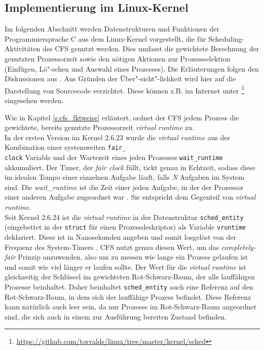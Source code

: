 \subsection{Implementierung im Linux-Kernel}\label{s:cstructs}
Im folgenden Abschnitt werden Datenstrukturen und Funktionen der Programmiersprache C aus dem Linux-Kernel vorgestellt, die für Scheduling-Aktivitäten des CFS genutzt werden. Dies umfasst die gewichtete Berechnung der genutzten Prozessorzeit sowie den nötigen Aktionen zur Prozessselektion (Einfügen, Lö"-schen und Auswahl eines Prozesses). Die Erläuterungen folgen den Diskussionen aus \cite{rlove}. Aus Gründen der Über"-sicht"-lichkeit wird hier auf die Darstellung von Sourcecode verzichtet. Diese können z.B. im Internet unter \footnote{\url{https://github.com/torvalds/linux/tree/master/kernel/sched}} eingesehen werden.

Wie in Kapitel \ref{s:cfs_fktweise} erläutert, ordnet der CFS jedem Prozess die gewichtete, bereits genutzte Prozessorzeit \textit{virtual runtime} zu. \\
In der ersten Version im Kernel 2.6.23 wurde die \textit{virtual runtime} aus der Kombination einer systemweiten \texttt{fair\_\\clock} Variable und der Wartezeit eines jeden Prozesses \texttt{wait\_runtime} akkumuliert. Der Timer, der \textit{fair clock} füllt, tickt genau in Echtzeit, sodass diese im idealen Tempo einer einzelnen Aufgabe läuft, falls \textit{N} Aufgaben im System sind. Die \textit{wait\_runtime} ist die Zeit einer jeden Aufgabe, in der der Prozessor einer anderen Aufgabe zugeordnet war \cite{cpabla}. Sie entspricht dem Gegenteil von \textit{virtual runtime}.\\
Seit Kernel 2.6.24 ist die \textit{virtual runtime} in der Datenstruktur \texttt{sched\_entity} (eingebettet in der \texttt{struct} für einen Prozessdeskriptor) als Variable \texttt{vrun\-time} deklariert. Diese ist in Nanosekunden angeben und somit losgelöst von der Frequenz des System-Timers \cite{rlove}. CFS nutzt genau diesen Wert, um das \textit{completely-fair} Prinzip anzuwenden, also um zu messen wie lange ein Prozess gelaufen ist und somit wie viel länger er laufen sollte.
Der Wert für die \textit{virtual runtime} ist gleichzeitig der Schlüssel im gewichteten Rot-Schwarz-Baum, der alle lauffähigen Prozesse beinhaltet. Daher beinhaltet \texttt{sched\_entity} auch eine Referenz auf den Rot-Schwarz-Baum, in dem sich der lauffähige Prozess befindet. Diese Referenz kann natürlich auch leer sein, da nur Prozesse im Rot-Schwarz-Baum angeordnet sind, die sich auch in einem zur Ausführung bereiten Zustand befinden.

